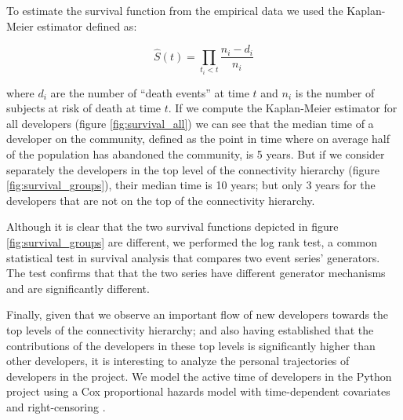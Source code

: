 To estimate the survival function from the empirical data we used the Kaplan-Meier estimator \citep{kaplan:1958} defined as:

$$
\hat{S}(t) = \prod_{t_i < t} \frac{n_i - d_i}{n_i}
$$

where $d_i$ are the number of ``death events'' at time $t$ and $n_i$ is the number of subjects at risk of death at time $t$. If we compute the Kaplan-Meier estimator for all developers (figure \ref{fig:survival_all}) we can see that the median time of a developer on the community, defined as the point in time where on average half of the population has abandoned the community, is 5 years. But if we consider separately the developers in the top level of the connectivity hierarchy (figure \ref{fig:survival_groups}), their median time is 10 years; but only 3 years for the developers that are not on the top of the connectivity hierarchy.

Although it is clear that the two survival functions depicted in figure \ref{fig:survival_groups} are different, we performed the log rank test, a common statistical test in survival analysis that compares two event series' generators. The test confirms that that the two series have different generator mechanisms and are significantly different.

Finally, given that we observe an important flow of new developers towards the top levels of the connectivity hierarchy; and also having established that the contributions of the developers in these top levels is significantly higher than other developers, it is interesting to analyze the personal trajectories of developers in the project. We model the active time of developers in the Python project using a Cox proportional hazards model with time-dependent covariates and right-censoring \citep[appendix on survival analysis]{fox:2002}.


